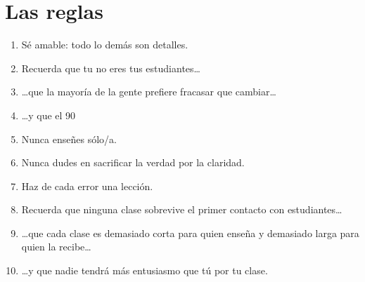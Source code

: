 \chapter*{Las reglas}

\begin{enumerate}

\item Sé amable: todo lo demás son detalles.\\

\item Recuerda que tu no eres tus estudiantes{\ldots}\\

\item {\ldots}que la mayoría de la gente prefiere fracasar que cambiar{\ldots}\\

\item {\ldots}y que el 90%

\item Nunca enseñes sólo/a.\\

\item Nunca dudes en sacrificar la verdad por la claridad.\\

\item Haz de cada error una lección.\\

\item Recuerda que ninguna clase sobrevive el primer contacto con estudiantes{\ldots}\\

\item {\ldots}que cada clase es demasiado corta para quien enseña y demasiado larga para quien la recibe{\ldots}\\

\item {\ldots}y que nadie tendrá más entusiasmo que tú por tu clase.

\end{enumerate}

